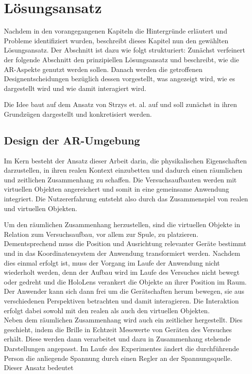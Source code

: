 \section{Lösungsansatz}
\label{sec-4}

Nachdem in den vorangegangenen Kapiteln die Hintergründe erläutert und Probleme identifiziert wurden, beschreibt dieses Kapitel nun den gewählten Lösungsansatz. Der Abschnitt ist dazu wie folgt strukturiert:
Zunächst verfeinert der folgende Abschnitt den prinzipiellen Lösungsansatz und beschreibt, wie die AR-Aspekte genutzt werden sollen. Danach werden die getroffenen Designentscheidungen bezüglich dessen vorgestellt, was angezeigt wird, wie es dargestellt wird und wie damit interagiert wird.

 Die Idee baut auf dem Ansatz von Strzys et. al. auf und soll zunächst in ihren Grundzügen dargestellt und konkretisiert werden.

\subsection{Design der AR-Umgebung}
\label{sec-4-1}
Im Kern besteht der Ansatz dieser Arbeit darin, die physikalischen Eigenschaften darzustellen, in ihren realen Kontext einzubetten und dadurch einen räumlichen und zeitlichen Zusammenhang zu schaffen. Die Versuchsaufbauten werden mit virtuellen Objekten angereichert und somit in eine gemeinsame Anwendung integriert. Die Nutzererfahrung entsteht also durch das Zusammenspiel von realen und virtuellen Objekten.


Um den räumlichen Zusammenhang herzustellen, sind die virtuellen Objekte in Relation zum Versuchsaufbau, vor allem zur Spule, zu platzieren. Dementsprechend muss die Position und Ausrichtung relevanter Geräte bestimmt und in das Koordinatensystem der Anwendung transformiert werden. Nachdem dies einmal erfolgt ist, muss der Vorgang im Laufe der Anwendung nicht wiederholt werden, denn der Aufbau wird im Laufe des Versuches nicht bewegt oder gedreht und die HoloLens verankert die Objekte an ihrer Position im Raum. Der Anwender kann sich dann frei um die Gerätschaften herum bewegen, sie aus verschiedenen Perspektiven betrachten und damit interagieren. Die Interaktion erfolgt dabei sowohl mit den realen als auch den virtuellen Objekten.\\

Neben dem räumlichen Zusammenhang wird auch ein zeitlicher hergestellt. Dies geschieht, indem die Brille in Echtzeit Messwerte von Geräten des Versuches erhält. Diese werden dann verarbeitet und dazu in Zusammenhang stehende Darstellungen angepasst. Im Laufe des Experimentes ändert die durchführende Person die anliegende Spannung durch einen Regler an der Spannungsquelle. Dieser Ansatz bedeutet 

